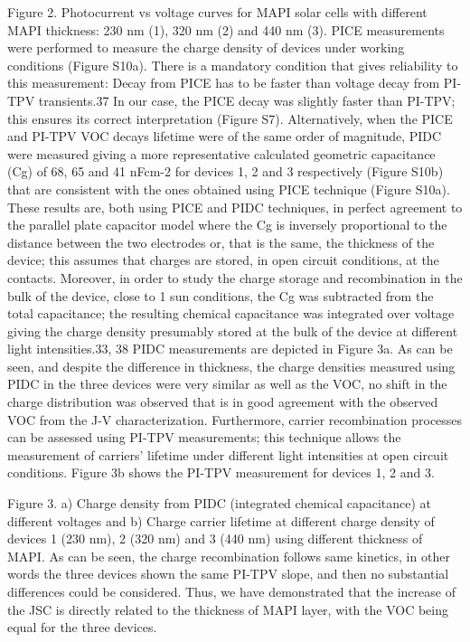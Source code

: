 Figure 2. Photocurrent vs voltage curves for MAPI solar cells with different MAPI thickness: 230 nm (1), 320 nm (2) and 440 nm (3).
PICE measurements were performed to measure the charge density of devices under working conditions (Figure S10a). There is a mandatory condition that gives reliability to this measurement: Decay from PICE has to be faster than voltage decay from PI-TPV transients.37 In our case, the PICE decay was slightly faster than PI-TPV; this ensures its correct interpretation (Figure S7). Alternatively, when the PICE and PI-TPV VOC decays lifetime were of the same order of magnitude, PIDC were measured giving a more representative calculated geometric capacitance (Cg) of 68, 65 and 41 nFcm-2 for devices 1, 2 and 3 respectively (Figure S10b) that are consistent with the ones obtained using PICE technique (Figure S10a). These results are, both using PICE and PIDC techniques, in perfect agreement to the parallel plate capacitor model where the Cg is inversely proportional to the distance between the two electrodes or, that is the same, the thickness of the device; this assumes that charges are stored, in open circuit conditions, at the contacts.
Moreover, in order to study the charge storage and recombination in the bulk of the device, close to 1 sun conditions, the Cg was subtracted from the total capacitance; the resulting chemical capacitance was integrated over voltage giving the charge density presumably stored at the bulk of the device at different light intensities.33, 38
PIDC measurements are depicted in Figure 3a. As can be seen, and despite the difference in thickness, the charge densities measured using PIDC in the three devices were very similar as well as the VOC, no shift in the charge distribution was observed that is in good agreement with the observed VOC from the J-V characterization. Furthermore, carrier recombination processes can be assessed using PI-TPV measurements; this technique allows the measurement of carriers’ lifetime under different light intensities at open circuit conditions. Figure 3b shows the PI-TPV measurement for devices 1, 2 and 3.


Figure 3. a) Charge density from PIDC (integrated chemical capacitance) at different voltages and b) Charge carrier lifetime at different charge density of devices 1 (230 nm), 2 (320 nm) and 3 (440 nm) using different thickness of MAPI.
As can be seen, the charge recombination follows same kinetics, in other words the three devices shown the same PI-TPV slope, and then no substantial differences could be considered. Thus, we have demonstrated that the increase of the JSC is directly related to the thickness of MAPI layer, with the VOC being equal for the three devices.



